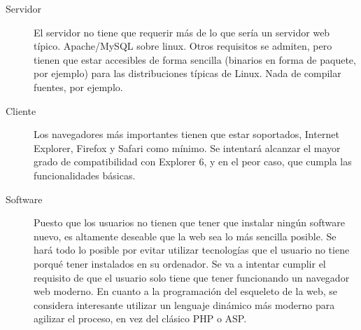 \begin{description}
	\item[Servidor] El servidor no tiene que requerir más de lo que sería un servidor web típico. Apache/MySQL sobre linux. Otros requisitos se admiten, pero tienen que estar accesibles de forma sencilla (binarios en forma de paquete, por ejemplo) para las distribuciones típicas de Linux. Nada de compilar fuentes, por ejemplo.
	\item[Cliente] Los navegadores más importantes tienen que estar soportados, Internet Explorer, Firefox y Safari como mínimo. Se intentará alcanzar el mayor grado de compatibilidad con Explorer 6, y en el peor caso, que cumpla las funcionalidades básicas.
	\item[Software] Puesto que los usuarios no tienen que tener que instalar ningún software nuevo, es altamente deseable que la web sea lo más sencilla posible. Se hará todo lo posible por evitar utilizar tecnologías que el usuario no tiene porqué tener instalados en su ordenador. Se va a intentar cumplir el requisito de que el usuario solo tiene que tener funcionando un navegador web moderno. En cuanto a la programación del esqueleto de la web, se considera interesante utilizar un lenguaje dinámico más moderno para agilizar el proceso, en vez del clásico PHP o ASP.
\end{description}
